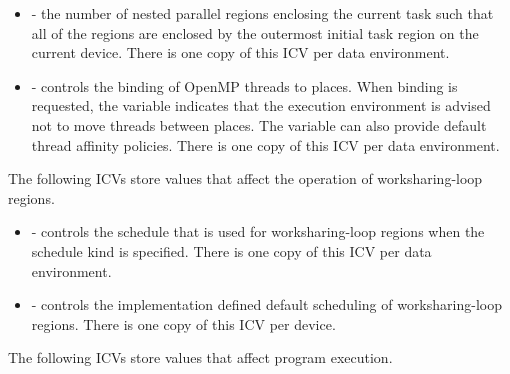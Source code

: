 \begin{itemize}
\item {} - the number of nested parallel regions enclosing the current 
      task such that all of the  regions are enclosed by the outermost 
      initial task region on the current device. There is one copy of this ICV per 
      data environment.

\item {} - controls the binding of OpenMP threads to places. When binding 
      is requested, the variable indicates that the execution environment is advised 
      not to move threads between places. The variable can also provide default thread 
      affinity policies. There is one copy of this ICV per data environment.
\end{itemize}

The following ICVs store values that affect the operation of worksharing-loop regions.

\begin{itemize}
\item {} - controls the schedule that is used for
worksharing-loop regions when the  schedule kind is
specified. There is one copy of this ICV per data environment.

\item {} - controls the implementation defined default
  scheduling of worksharing-loop regions. There is one copy of this ICV per device.
\end{itemize}

The following ICVs store values that affect program execution.

